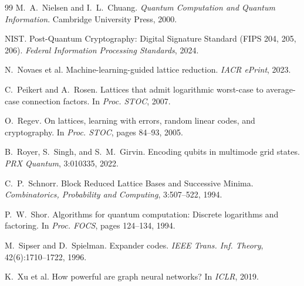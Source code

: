 ﻿\documentclass[a4paper,12pt]{article}
\theoremstyle{definition}
\begin{document}
\begin{thebibliography}{99}
M.~A.~Nielsen and I.~L.~Chuang.
\newblock \textit{Quantum Computation and Quantum Information}.
\newblock Cambridge University Press, 2000.

{NIST}.
\newblock Post-Quantum Cryptography: Digital Signature Standard (FIPS 204, 205, 206).
\newblock \textit{Federal Information Processing Standards}, 2024.

N.~Novaes et al.
\newblock Machine-learning-guided lattice reduction.
\newblock \textit{IACR ePrint}, 2023.

C.~Peikert and A.~Rosen.
\newblock Lattices that admit logarithmic worst-case to average-case connection
  factors.
\newblock In \textit{Proc. STOC}, 2007.

O.~Regev.
\newblock On lattices, learning with errors, random linear codes, and
  cryptography.
\newblock In \textit{Proc. STOC}, pages 84--93, 2005.

B.~Royer, S.~Singh, and S.~M.~Girvin.
\newblock Encoding qubits in multimode grid states.
\newblock \textit{PRX Quantum}, 3:010335, 2022.

C.~P.~Schnorr.
\newblock Block Reduced Lattice Bases and Successive Minima.
\newblock \textit{Combinatorics, Probability and Computing}, 3:507--522, 1994.

P.~W.~Shor.
\newblock Algorithms for quantum computation: Discrete logarithms and
  factoring.
\newblock In \textit{Proc. FOCS}, pages 124--134, 1994.

M.~Sipser and D.~Spielman.
\newblock Expander codes.
\newblock \textit{IEEE Trans. Inf. Theory}, 42(6):1710--1722, 1996.

K.~Xu et al.
\newblock How powerful are graph neural networks?
\newblock In \textit{ICLR}, 2019.

\end{thebibliography}
\end{document}
